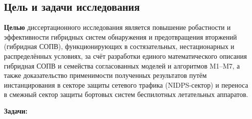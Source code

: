 \documentclass[12pt,a5paper]{article}
\begin{document}
\subsection*{Цель и задачи исследования}

\textbf{Целью} диссертационного исследования является повышение
робастности и эффективности гибридных систем обнаружения и
предотвращения вторжений (гибридная СОПВ), функционирующих в
состязательных, нестационарных и распределённых условиях, за
счёт разработки единого математического описания гибридная СОПВ и
семейства согласованных моделей и алгоритмов M1--M7, а также
доказательство применимости полученных результатов путём
инстанцирования в секторе защиты сетевого трафика
(NIDPS-сектор) и переноса в смежный сектор защиты бортовых
систем беспилотных летательных аппаратов.

\textbf{Задачи:}
\end{document}
